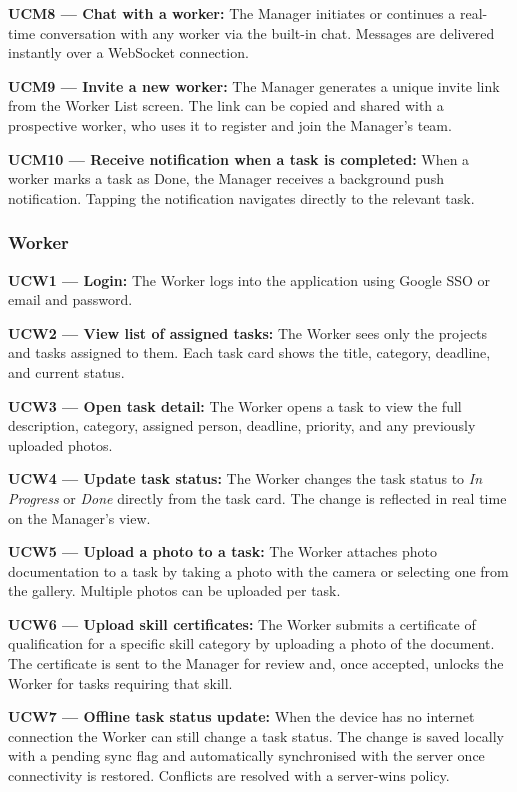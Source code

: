 \documentclass[12pt,a4paper]{article}
\begin{document}
\textbf{UCM8 --- Chat with a worker:} The Manager initiates or continues a real-time conversation with any worker via the built-in chat. Messages are delivered instantly over a WebSocket connection.

\textbf{UCM9 --- Invite a new worker:} The Manager generates a unique invite link from the Worker List screen. The link can be copied and shared with a prospective worker, who uses it to register and join the Manager's team.

\textbf{UCM10 --- Receive notification when a task is completed:} When a worker marks a task as Done, the Manager receives a background push notification. Tapping the notification navigates directly to the relevant task.

\subsubsection{Worker}

\textbf{UCW1 --- Login:} The Worker logs into the application using Google SSO or email and password.

\textbf{UCW2 --- View list of assigned tasks:} The Worker sees only the projects and tasks assigned to them. Each task card shows the title, category, deadline, and current status.

\textbf{UCW3 --- Open task detail:} The Worker opens a task to view the full description, category, assigned person, deadline, priority, and any previously uploaded photos.

\textbf{UCW4 --- Update task status:} The Worker changes the task status to \textit{In Progress} or \textit{Done} directly from the task card. The change is reflected in real time on the Manager's view.

\textbf{UCW5 --- Upload a photo to a task:} The Worker attaches photo documentation to a task by taking a photo with the camera or selecting one from the gallery. Multiple photos can be uploaded per task.

\textbf{UCW6 --- Upload skill certificates:} The Worker submits a certificate of qualification for a specific skill category by uploading a photo of the document. The certificate is sent to the Manager for review and, once accepted, unlocks the Worker for tasks requiring that skill.

\textbf{UCW7 --- Offline task status update:} When the device has no internet connection the Worker can still change a task status. The change is saved locally with a pending sync flag and automatically synchronised with the server once connectivity is restored. Conflicts are resolved with a server-wins policy.
\end{document}
